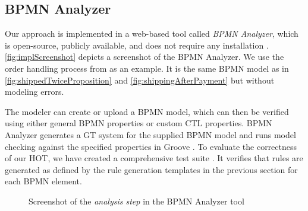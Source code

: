\documentclass{lmcs} %
\begin{document}
\subsection{BPMN Analyzer}

Our approach is implemented in a web-based tool called \textit{BPMN Analyzer}, which is open-source, publicly available, and does not require any installation \cite{timkrauterLMCS2024Artifacts2023, krauterFormalizationAnalysisBPMN2023}.
\autoref{fig:implScreenshot} depicts a screenshot of the BPMN Analyzer.
We use the order handling process from \cite{ruckerPracticalProcessAutomation2021} as an example.
It is the same BPMN model as in \autoref{fig:shippedTwiceProposition} and \autoref{fig:shippingAfterPayment} but without modeling errors.

The modeler can create or upload a BPMN model, which can then be verified using either general BPMN properties or custom CTL properties.
BPMN Analyzer generates a GT system for the supplied BPMN model and runs model checking against the specified properties in Groove \cite{kastenbergModelCheckingDynamic2006}. 
To evaluate the correctness of our HOT, we have created a comprehensive test suite \cite{timkrauterLMCS2024Artifacts2023}.
It verifies that rules are generated as defined by the rule generation templates in the previous section for each BPMN element.

\begin{figure}[ht]
    \centering
    \caption{Screenshot of the \textit{analysis step} in the BPMN Analyzer tool}
    \label{fig:implScreenshot}
\end{figure}
\end{document}
